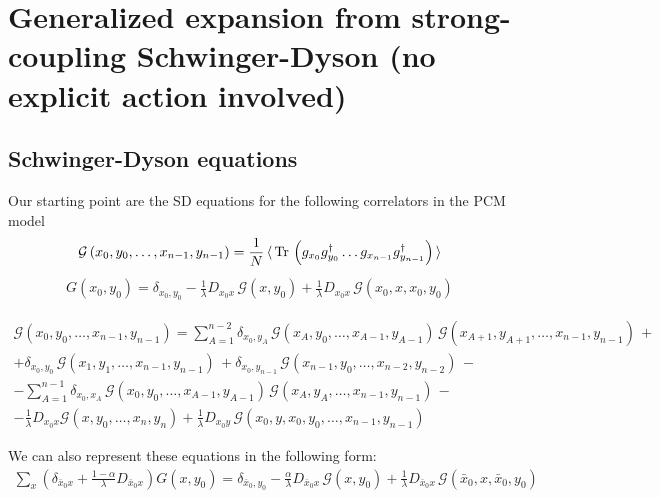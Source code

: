 \documentclass[12pt]{article}
\newcommand{\lr}[1]{ \left( #1 \right) }
\newcommand{\vev}[1]{ \langle \, #1 \, \rangle }
\newcommand{\tr}{ {\rm Tr} \, }
\newcommand{\G}{\mathcal{G}}
\begin{document}
\section*{Generalized expansion from strong-coupling Schwinger-Dyson (no explicit action involved)}

\subsection*{Schwinger-Dyson equations}

Our starting point are the SD equations for the following correlators in the PCM model
\begin{eqnarray}
\label{gf_def}
\G\lr{x_0, y_0, \ldots, x_{n-1}, y_{n-1}}
=
\frac{1}{N}\, \vev{ \tr\lr{
g_{x_0} g^{\dag}_{y_0} \ldots g_{x_{n-1}} g^{\dag}_{y_{n-1}}} }
\end{eqnarray}
\begin{eqnarray}
\label{SDs_n2}
G\lr{x_0, y_0} =
\delta_{x_0, y_0}
 - %
\frac{1}{\lambda} D_{x_0 x} \, \G\lr{x, y_0}
 +
\frac{1}{\lambda} D_{x_0 x} \, \G\lr{x_0, x, x_0, y_0}
\end{eqnarray}

\begin{eqnarray}
\label{SDs}
\G\lr{x_0, y_0, \ldots, x_{n-1}, y_{n-1}}
= %
\sum\limits_{A=1}^{n-2} \delta_{x_0, y_A} \,
\G\lr{x_A, y_0, \ldots, x_{A-1}, y_{A-1}}\,
\G\lr{x_{A+1}, y_{A+1}, \ldots, x_{n-1}, y_{n-1}}\,
+ \nonumber \\ +
\delta_{x_0, y_0} \, \G\lr{x_1, y_1, \ldots, x_{n-1}, y_{n-1}}\,
+
\delta_{x_0, y_{n-1}} \, \G\lr{x_{n-1}, y_0, \ldots, x_{n-2}, y_{n-2}}\,
- \nonumber \\ -
\sum\limits_{A=1}^{n-1} \delta_{x_0, x_A} \,
 \G\lr{x_0, y_0, \ldots, x_{A-1}, y_{A-1}}\,
 \G\lr{x_A, y_A, \ldots, x_{n-1}, y_{n-1}}\,
- \nonumber \\ -
\frac{1}{\lambda} D_{x_0 x} \G\lr{x, y_0, \ldots, x_n, y_n}
+
\frac{1}{\lambda} D_{x_0 y} \, \G\lr{x_0, y, x_0, y_0, \ldots, x_{n-1}, y_{n-1}}
\end{eqnarray}

We can also represent these equations in the following form:
\begin{eqnarray}
\label{SDs_n2_1}
\sum\limits_x \lr{\delta_{\bar{x}_0 x} + \frac{1-\alpha}{\lambda} D_{\bar{x}_0 x} } G\lr{x, y_0} =
\delta_{\bar{x}_0, y_0}
 - %
\frac{\alpha}{\lambda} D_{\bar{x}_0 x} \, \G\lr{x, y_0}
 +
\frac{1}{\lambda} D_{\bar{x}_0 x} \, \G\lr{\bar{x}_0, x, \bar{x}_0, y_0}
\end{eqnarray}
\end{document}
